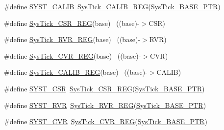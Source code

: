 \begin{DoxyCompactItemize}
\item 
\#define \hyperlink{group___sys_tick___register___accessor___macros_ga2d37582dd39f59744e340cce09230250}{S\+Y\+S\+T\+\_\+\+C\+A\+L\+IB}~\hyperlink{group___sys_tick___register___accessor___macros_gab41be68de8d2d31d938d419f9feb900f}{Sys\+Tick\+\_\+\+C\+A\+L\+I\+B\+\_\+\+R\+EG}(\hyperlink{group___sys_tick___peripheral_gaeef73642fdef722ce658e468dad877ea}{Sys\+Tick\+\_\+\+B\+A\+S\+E\+\_\+\+P\+TR})
\item 
\#define \hyperlink{group___sys_tick___register___accessor___macros_ga07f2beb63f7b50b9e1fa8b383d9ca87c}{Sys\+Tick\+\_\+\+C\+S\+R\+\_\+\+R\+EG}(base)                                    ~((base)-\/$>$C\+SR)
\item 
\#define \hyperlink{group___sys_tick___register___accessor___macros_gae6985161bde8ca82ac983a2d43839595}{Sys\+Tick\+\_\+\+R\+V\+R\+\_\+\+R\+EG}(base)                                    ~((base)-\/$>$R\+VR)
\item 
\#define \hyperlink{group___sys_tick___register___accessor___macros_ga12164c6b1ad1c5e5d5cac7129940d0bf}{Sys\+Tick\+\_\+\+C\+V\+R\+\_\+\+R\+EG}(base)                                    ~((base)-\/$>$C\+VR)
\item 
\#define \hyperlink{group___sys_tick___register___accessor___macros_gab41be68de8d2d31d938d419f9feb900f}{Sys\+Tick\+\_\+\+C\+A\+L\+I\+B\+\_\+\+R\+EG}(base)                                ~((base)-\/$>$C\+A\+L\+IB)
\item 
\#define \hyperlink{group___sys_tick___register___accessor___macros_gab26b3fc75982181f81b185b206e897f6}{S\+Y\+S\+T\+\_\+\+C\+SR}~\hyperlink{group___sys_tick___register___accessor___macros_ga07f2beb63f7b50b9e1fa8b383d9ca87c}{Sys\+Tick\+\_\+\+C\+S\+R\+\_\+\+R\+EG}(\hyperlink{group___sys_tick___peripheral_gaeef73642fdef722ce658e468dad877ea}{Sys\+Tick\+\_\+\+B\+A\+S\+E\+\_\+\+P\+TR})
\item 
\#define \hyperlink{group___sys_tick___register___accessor___macros_ga4e8efcc1f2b551dbf3cb0aae1231e380}{S\+Y\+S\+T\+\_\+\+R\+VR}~\hyperlink{group___sys_tick___register___accessor___macros_gae6985161bde8ca82ac983a2d43839595}{Sys\+Tick\+\_\+\+R\+V\+R\+\_\+\+R\+EG}(\hyperlink{group___sys_tick___peripheral_gaeef73642fdef722ce658e468dad877ea}{Sys\+Tick\+\_\+\+B\+A\+S\+E\+\_\+\+P\+TR})
\item 
\#define \hyperlink{group___sys_tick___register___accessor___macros_gae3dc4d2dbfdf38c593a5581415fecfed}{S\+Y\+S\+T\+\_\+\+C\+VR}~\hyperlink{group___sys_tick___register___accessor___macros_ga12164c6b1ad1c5e5d5cac7129940d0bf}{Sys\+Tick\+\_\+\+C\+V\+R\+\_\+\+R\+EG}(\hyperlink{group___sys_tick___peripheral_gaeef73642fdef722ce658e468dad877ea}{Sys\+Tick\+\_\+\+B\+A\+S\+E\+\_\+\+P\+TR})

\end{DoxyCompactItemize}
